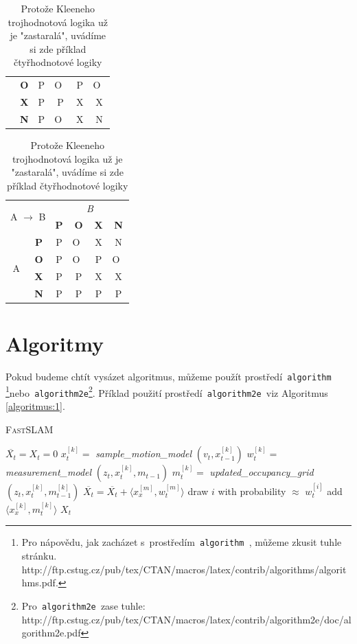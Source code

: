 \documentclass[a4paper, 11pt]{article}
\begin{document}
\begin{table}[ht]
\begin{tabular}{ |c|c|c|c|c|c| }
                       & \textbf{O} & P & O~& P & O~\\
                       & \textbf{X} & P & P & X & X \\
                       & \textbf{N} & P & O~& X & N \\
    \hline
  \end{tabular}
  \begin{tabular}{ |c|c|c|c|c|c| }
    \hline
    \multicolumn{2}{|c|}{\multirow{2}{*}{A $\to$ B}} &\multicolumn{4}{|c|}{\emph{B}} \\
    \cline{3-6}
    \multicolumn{2}{|c|}{} & \textbf{P} & \textbf{O} & \textbf{X} & \textbf{N} \\
    \hline
    \multirow{4}{*}{A} & \textbf{P} & P & O~& X & N \\
                       & \textbf{O} & P & O~& P & O~\\
                       & \textbf{X} & P & P & X & X \\
                       & \textbf{N} & P & P & P & P \\
    \hline
  \end{tabular}
  \caption{Protože Kleeneho trojhodnotová logika už je "zastaralá", uvádíme si zde příklad čtyřhodnotové logiky}
  \label{tabulka:2}
\end{table}

\section{Algoritmy}\label{sekce:3}
Pokud budeme chtít vysázet algoritmus, můžeme použít prostředí\texttt{ algorithm }\footnote{Pro nápovědu, jak zacházet s~prostředím\texttt{ algorithm }, můžeme zkusit tuhle stránku.\\ http://ftp.cstug.cz/pub/tex/CTAN/macros/latex/contrib/algorithms/algorithms.pdf.}nebo\texttt{ algorithm2e}\footnote{Pro\texttt{ algorithm2e }zase tuhle: http://ftp.cstug.cz/pub/tex/CTAN/macros/latex/contrib/algorithm2e/doc/algorithm2e.pdf}. Příklad použití prostředí\texttt{ algorithm2e }viz Algoritmus \ref{algoritmus:1}.

\begin{algorithm}[h]\label{algoritmus:1}
  \caption{\textsc{Fast}SLAM}
  \SetNlSty{}{}{:}
  \SetNlSkip{-1.25em}
  \SetInd{0.85em}{0.85em}
  \DontPrintSemicolon
  \Indp
  \BlankLine
  $\overline{X_t} = X_t = 0$\;
  {
    $x_t^{[k]} = $ \emph{sample\_motion\_model} $(v_t,x_{t-1}^{[k]})$\;
    $w_t^{[k]} = $ \emph{measurement\_model} $(z_t,x_t^{[k]},m_{t-1})$\;
    $m_t^{[k]} = $ \emph{updated\_occupancy\_grid} $(z_t,x_t^{[k]},m_{t-1}^{[k]})$\;
    $\overline{X_t} = \overline{X_t} + \langle x_x^{[m]}, w_t^{[m]}\rangle $
  }
  {
    draw $i$ with probability $\approx$ $w_t^{[i]}$\;
    add $\langle x_x^{[k]}, m_t^{[k]}\rangle $ \KwTo $X_t $\;
  }
\end{algorithm}
\end{document}
